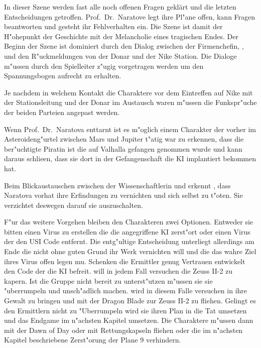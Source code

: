 \begin{remarks}
	In dieser Szene werden fast alle noch offenen Fragen geklärt und die letzten Entscheidungen getroffen. Prof.~Dr.~Naratove legt ihre Pl"ane offen, kann Fragen beantworten und gesteht ihr Fehlverhalten ein. Die Szene ist damit der H"ohepunkt der Geschichte mit der Melancholie eines tragischen Endes. Der Beginn der Szene ist dominiert durch den Dialog zwischen der Firmenchefin, \xl{}, \ml{} und den R"uckmeldungen von der Donar und der Nike Station. Die Dialoge m"ussen durch den Spielleiter z"ugig vorgetragen werden um den Spannungsbogen aufrecht zu erhalten.

	Je nachdem in welchem Kontakt die Charaktere vor dem Eintreffen auf Nike mit der Stationsleitung und der Donar im Austausch waren m"ussen die Funkspr"uche der beiden Parteien angepast werden.

	Wenn Prof.~Dr.~Naratova \xl{} enttarnt ist es m"oglich einem Charakter der vorher im Asteroideng"urtel zwischen Mars und Jupiter t"atig war zu erkennen, dass \xl{} die ber"uchtigte Piratin ist die auf Valhalla gefangen genommen wurde und kann daraus schlie\3en, dass sie dort in der Gefangenschaft die KI implantiert bekommen hat.

	Beim Blickaustauschen zwischen der Wissenschaftlerin und \xl{} erkennt \xl{}, dass Naratova vorhat ihre Erfindungen zu vernichten und sich selbst zu t"oten. Sie verzichtet deswegen darauf sie auszuschalten.

	F"ur das weitere Vorgehen bleiben den Charakteren zwei Optionen. Entweder sie bitten \ml{} einen Virus zu erstellen die die angegriffene KI zerst"ort oder einen Virus der den USI Code entfernt. Die entg"ultige Entscheidung unterliegt allerdings am Ende \ml{} die nicht ohne guten Grund ihr Werk vernichten will und die das wahre Ziel ihres Virus offen legen mu\3. Schenken die Ermittler \xl{} genug Vertrauen entwickelt \ml{} den Code der die KI befreit. \xl{} will in jedem Fall versuchen die Zeuss II-2 zu kapern. Ist die Gruppe nicht bereit \xl{} zu unterst"utzen m"ussen sie sie "uberrumpeln und unsch"adlich machen. \xl{} wird in diesem Falle versuchen \ml{} in ihre Gewalt zu bringen und mit der Dragon Blade zur Zeuss II-2 zu fliehen. Gelingt es den Ermittlern nicht \xl{} zu "Uberrumpeln wird sie ihren Plan in die Tat umsetzen und das Endgame im n"achsten Kapitel umsetzen. Die Charaktere m"ussen dann mit der Dawn of Day oder mit Rettungskapseln fliehen oder die im n"achsten Kapitel beschriebene Zerst"orung der Plane 9 verhindern.
\end{remarks}

